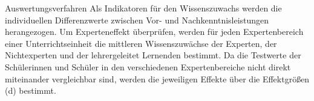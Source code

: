 \documentclass[final]{beamer}
\newlength{\onecolwid}
\newlength{\twocolwid}
\begin{document}
\begin{frame}[t]
\begin{columns}[t]
\begin{column}{\twocolwid}
\begin{alertblock}{Auswertungsverfahren}
Als Indikatoren für den Wissenszuwachs werden die individuellen Differenzwerte zwischen Vor- und Nachkenntnisleistungen herangezogen. Um Experteneffekt überprüfen, werden für jeden Expertenbereich einer Unterrichtseinheit die mittleren Wissenszuwächse der Experten, der Nichtexperten und der lehrergeleitet Lernenden bestimmt. Da die Testwerte der Schülerinnen und Schüler in den verschiedenen Expertenbereiche nicht direkt miteinander vergleichbar sind, werden die jeweiligen Effekte über die Effektgrößen (d) bestimmt.
\end{alertblock} 


\begin{columns}[t,totalwidth=\twocolwid] %
\begin{column}{\onecolwid} %
%
%
%
\end{column} %


\begin{column}{\onecolwid} %
%
%
%
\end{column} %


\end{columns} %
\end{column} %
\end{columns} %
\end{frame} %
\end{document}
